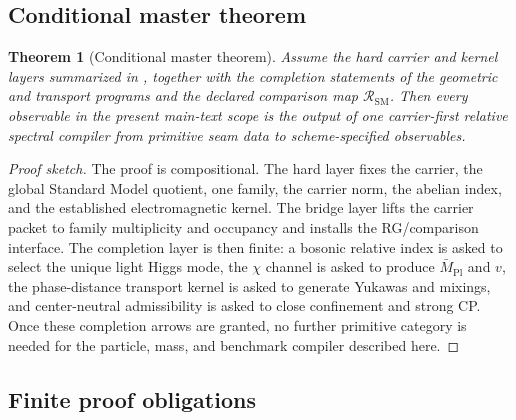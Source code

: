 \documentclass[11pt,a4paper]{article}
\newtheorem{theorem}{Theorem}[section]
\theoremstyle{definition}
\theoremstyle{remark}
\newcommand{\Mpl}{\bar M_{\mathrm{Pl}}}
\newcommand{\SM}{\mathrm{SM}}
\begin{document}
\subsection{Conditional master theorem}

\begin{theorem}[Conditional master theorem]
Assume the hard carrier and kernel layers summarized in , together with the completion statements of the geometric and transport programs and the declared comparison map $\mathcal R_{\SM}$. Then every observable in the present main-text scope is the output of one carrier-first relative spectral compiler from primitive seam data to scheme-specified observables.
\end{theorem}

\begin{proof}[Proof sketch]
The proof is compositional. The hard layer fixes the carrier, the global Standard Model quotient, one family, the carrier norm, the abelian index, and the established electromagnetic kernel. The bridge layer lifts the carrier packet to family multiplicity and occupancy and installs the RG/comparison interface. The completion layer is then finite: a bosonic relative index is asked to select the unique light Higgs mode, the $\chi$ channel is asked to produce $\Mpl$ and $v$, the phase-distance transport kernel is asked to generate Yukawas and mixings, and center-neutral admissibility is asked to close confinement and strong CP. Once these completion arrows are granted, no further primitive category is needed for the particle, mass, and benchmark compiler described here.
\end{proof}

\subsection{Finite proof obligations}
\end{document}
